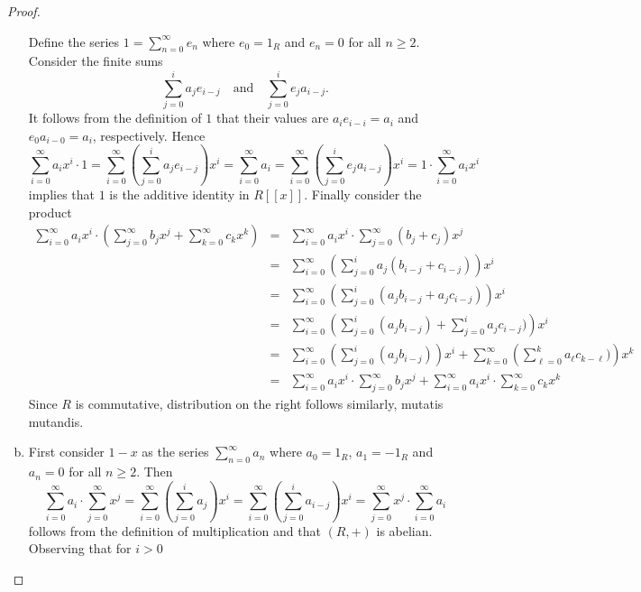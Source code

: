 \documentclass[10pt]{amsart}
\begin{document}
\begin{thm}
\begin{proof}
\begin{enumerate}[(a)]
      Define the series $1 = \sum_{n=0}^\infty e_n$ where $e_0 = 1_R$ and $e_n = 0$ for all $n \geq 2$.  
      Consider the finite sums 
      \begin{equation*}
        \sum_{j=0}^i a_j e_{i-j}\quad \text{and}\quad \sum_{j=0}^i e_j a_{i-j}.
      \end{equation*}
      It follows from the definition of $1$ that their values are  $a_ie_{i-i} = a_i$ and $e_0a_{i-0} = a_i$, respectively.
      Hence 
      $$\sum_{i=0}^\infty a_ix^i \cdot 1 = \sum_{i=0}^\infty \left(\sum_{j=0}^i a_j e_{i-j}\right)x^i  = \sum_{i=0}^\infty a_i =\sum_{i=0}^\infty \left(\sum_{j=0}^i e_j a_{i-j}\right)x^i = 1 \cdot \sum_{i=0}^\infty a_ix^i$$
      implies that $1$ is the additive identity in $R[[x]]$.
      Finally consider the product
      \begin{eqnarray*}
        \sum_{i=0}^\infty a_ix^i \cdot \left(\sum_{j=0}^\infty b_jx^j + \sum_{k=0}^\infty c_kx^k \right) &=& \sum_{i=0}^\infty a_ix^i \cdot \sum_{j=0}^\infty (b_j + c_j)x^j\\
        &=& \sum_{i=0}^\infty \left(\sum_{j=0}^i a_j(b_{i-j} + c_{i-j})\right)x^i\\
        &=& \sum_{i=0}^\infty \left(\sum_{j=0}^i (a_jb_{i-j} + a_jc_{i-j})\right)x^i\\
        &=& \sum_{i=0}^\infty \left(\sum_{j=0}^i (a_jb_{i-j}) +  \sum_{j=0}^i a_jc_{i-j})\right)x^i\\
        &=& \sum_{i=0}^\infty \left(\sum_{j=0}^i (a_jb_{i-j})\right)x^i +  \sum_{k=0}^\infty \left(\sum_{\ell=0}^k a_{\ell}c_{k-\ell})\right)x^k\\
        &=& \sum_{i=0}^\infty a_ix^i \cdot \sum_{j=0}^\infty b_jx^j + \sum_{i=0}^\infty a_ix^i \cdot \sum_{k=0}^\infty c_kx^k
      \end{eqnarray*}
      Since $R$ is commutative, distribution on the right follows similarly, mutatis mutandis.
    \item
      First consider $1 - x$ as the series $\sum_{n=0}^\infty a_n$ where $a_0 = 1_R$, $a_1 = -1_R$ and $a_n = 0$ for all $n \geq 2$.
      Then 
      $$\sum_{i=0}^\infty a_i \cdot \sum_{j = 0}^\infty x^j = \sum_{i=0}^\infty\left(\sum_{j=0}^i a_j\right)x^i = \sum_{i=0}^\infty\left(\sum_{j=0}^i a_{i-j}\right)x^i = \sum_{j = 0}^\infty x^j \cdot \sum_{i=0}^\infty a_i$$
       follows from the definition of multiplication and that $(R, +)$ is abelian.
      Observing that for $i > 0$
      \begin{equation*}

\end{equation*}
\end{enumerate}
\end{proof}
\end{thm}
\end{document}
